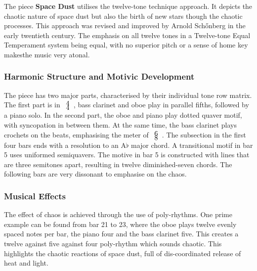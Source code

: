 \documentclass{article}
\begin{document}
The piece \textbf{Space Dust} utilises the twelve-tone technique approach. It
depicts the chaotic nature of space dust but also the birth of new stars though
the chaotic processes. This approach was revised and improved by Arnold
Schőnberg in the early twentieth century. The emphasis on all twelve tones in a
Twelve-tone Equal Temperament system being equal, with no superior pitch or a
sense of home key makesthe music very atonal.\\

\subsubsection{Harmonic Structure and Motivic Development}

The piece has two major parts, characterised by their individual tone row
matrix. The first part is in
\(\def\arraystretch{0.0}\begin{array}{c}4\\4\end{array}\), bass clarinet and
oboe play in parallel fifths, followed by a piano solo. In the second part,
the oboe and piano play dotted quaver motif, with syncopation in between them.
At the same time, the bass clarinet plays crochets on the beats, emphasising
the meter of \(\def\arraystretch{0}\begin{array}{c}6\\8\end{array}\).  The
subsection in the first four bars ends with a resolution to an A\(\flat\)
major chord. A transitional motif in bar 5 uses uniformed semiquavers. The
motive in bar 5 is constructed with lines that are three semitones apart, resulting
in twelve diminished-seven chords.  The following bars are very dissonant to emphasise
on the chaos.\\

\subsubsection{Musical Effects}

The effect of chaos is achieved through the use of poly-rhythms. One prime
example can be found from bar 21 to 23, where the oboe plays twelve evenly spaced
notes per bar, the piano four and the bass clarinet five. This creates a twelve against five
against four poly-rhythm which sounds chaotic. This highlights the chaotic
reactions of space dust, full of dis-coordinated release of heat and light.\\
\end{document}
